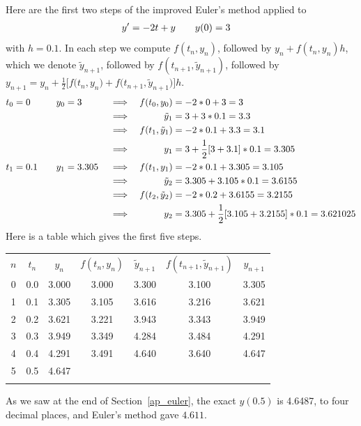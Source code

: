 Here are the first two steps of the improved Euler's method applied to
\begin{align*}
y'&=-2t+y\qquad
y(0)  = 3\cr
\end{align*}
with $h=0.1$. In each step we compute $f(t_n,y_n)$, followed by
$y_n+f(t_n,y_n)h$,  which we denote $\tilde y_{n+1}$,
followed by $f(t_{n+1},\tilde y_{n+1})$, followed by
$y_{n+1}=y_n+
\frac{1}{2}\big[f\big(t_n,y_n\big)+f\big(t_{n+1},\tilde y_{n+1}\big)\big]h$.
\begin{alignat*}{7}
t_0&=0 & y_0&=3 & &\implies & f(t_0,y_0)&=-2*0+3 =3 \\
 & & &  & &\implies & \tilde y_1&=3+3*0.1 =3.3 \\
 & & &  & &\implies & f(t_1,\tilde y_1)&=-2*0.1+3.3 =3.1 \\
 & &  & & &\implies & y_1&=3+\frac{1}{2}[3+3.1]*0.1 =3.305 \cr
t_1&=0.1\quad & y_1&=3.305 & &\implies & f(t_1,y_1)&=-2*0.1+3.305 =3.105 \\
 & & &  & &\implies & \tilde y_2&=3.305+3.105*0.1 =3.6155 \\
 & & &  & &\implies & f(t_2,\tilde y_2)&=-2*0.2+3.6155  =3.2155 \\
 & &  & & &\implies & y_2&=3.305+\frac{1}{2}[3.105+3.2155]*0.1 =3.621025 
\end{alignat*}
Here is a table which gives the first five steps.

\begin{center}
\def\arraystretch{1.25}%
\begin{tabular}{ !{\vrule width 1.5pt} c !{\vrule width 1pt} c | c | c | c |c | c  !{\vrule width 1.5pt}}
$n$ & $t_n$ & $y_n$ & $f(t_n,y_n)$ & $\tilde y_{n+1}$ & 
     $f(t_{n+1},\tilde y_{n+1})$ & $y_{n+1}$ \\
  0 & 0.0 & 3.000 & 3.000 & 3.300 & 3.100 & 3.305  \\
 & 0.1 & 3.305 & 3.105 & 3.616 & 3.216 & 3.621  \\
 & 0.2 & 3.621 & 3.221 & 3.943 & 3.343 & 3.949 \\
 & 0.3 & 3.949 & 3.349 & 4.284 & 3.484 & 4.291 \\
 & 0.4 & 4.291 & 3.491 & 4.640 & 3.640 & 4.647 \\
 &0.5 & 4.647 &       &       &       &  \\
\end{tabular}
\def\arraystretch{1.0}%
\end{center}
As we saw at the end of Section~\ref{ap_euler}, the exact $y(0.5)$ is
4.6487, to four decimal places, and Euler's method gave $4.611$.

